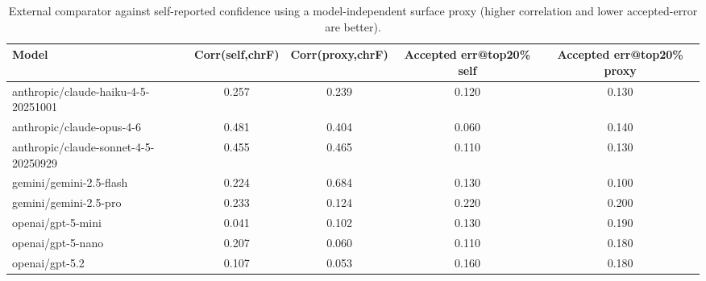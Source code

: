 \begin{table}[t]
\centering
\small
\begin{tabular}{lcccc}
\toprule
Model & Corr(self,chrF) & Corr(proxy,chrF) & Accepted err@top20\% self & Accepted err@top20\% proxy \\
\midrule
anthropic/claude-haiku-4-5-20251001 & 0.257 & 0.239 & 0.120 & 0.130 \\
anthropic/claude-opus-4-6 & 0.481 & 0.404 & 0.060 & 0.140 \\
anthropic/claude-sonnet-4-5-20250929 & 0.455 & 0.465 & 0.110 & 0.130 \\
gemini/gemini-2.5-flash & 0.224 & 0.684 & 0.130 & 0.100 \\
gemini/gemini-2.5-pro & 0.233 & 0.124 & 0.220 & 0.200 \\
openai/gpt-5-mini & 0.041 & 0.102 & 0.130 & 0.190 \\
openai/gpt-5-nano & 0.207 & 0.060 & 0.110 & 0.180 \\
openai/gpt-5.2 & 0.107 & 0.053 & 0.160 & 0.180 \\
\bottomrule
\end{tabular}
\caption{External comparator against self-reported confidence using a model-independent surface proxy (higher correlation and lower accepted-error are better).}
\label{tab:external_comparator}
\end{table}
